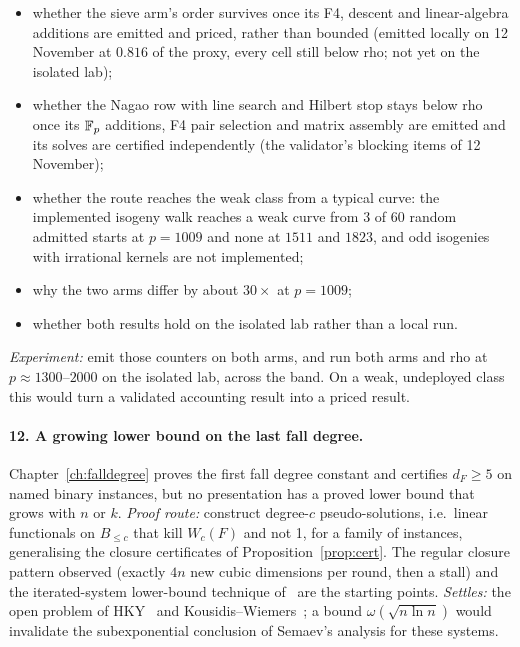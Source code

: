 \begin{itemize}
\item whether the sieve arm's order survives once its F4, descent and
  linear-algebra additions are emitted and priced, rather than bounded
  (emitted locally on 12 November at $0.816$ of the proxy, every cell
  still below rho; not yet on the isolated lab);
\item whether the Nagao row with line search and Hilbert stop stays below
  rho once its $\mathbb{F}_p$ additions, F4 pair selection and matrix assembly are
  emitted and its solves are certified independently (the validator's
  blocking items of 12 November);
\item whether the route reaches the weak class from a typical curve: the
  implemented isogeny walk reaches a weak curve from 3 of 60 random
  admitted starts at $p=1009$ and none at $1511$ and $1823$, and odd
  isogenies with irrational kernels are not implemented;
\item why the two arms differ by about $30\times$ at $p=1009$;
\item whether both results hold on the isolated lab rather than a local
  run.
\end{itemize}
\emph{Experiment:} emit those counters on both arms, and run both arms and
rho at $p\approx1300$--$2000$ on the isolated lab, across the band. On a
weak, undeployed class this would turn a validated accounting result into a
priced result.

\paragraph{12. A growing lower bound on the last fall degree.} Chapter~\ref{ch:falldegree}
proves the first fall degree constant and certifies $d_F\ge5$ on named
binary instances, but no presentation has a proved lower bound that grows
with $n$ or $k$. \emph{Proof route:} construct degree-$c$ pseudo-solutions,
i.e.\ linear functionals on $B_{\le c}$ that kill $W_c(F)$ and not 1, for a
family of instances, generalising the closure certificates of
Proposition~\ref{prop:cert}. The regular closure pattern observed (exactly
$4n$ new cubic dimensions per round, then a stall) and the
iterated-system lower-bound technique of~\cite{iterated2023} are the
starting points. \emph{Settles:} the open problem of
HKY~\cite{hky2015} and Kousidis--Wiemers~\cite{kousidis2019}; a bound
$\omega(\sqrt{n\ln n})$ would invalidate the subexponential conclusion of
Semaev's analysis for these systems.

